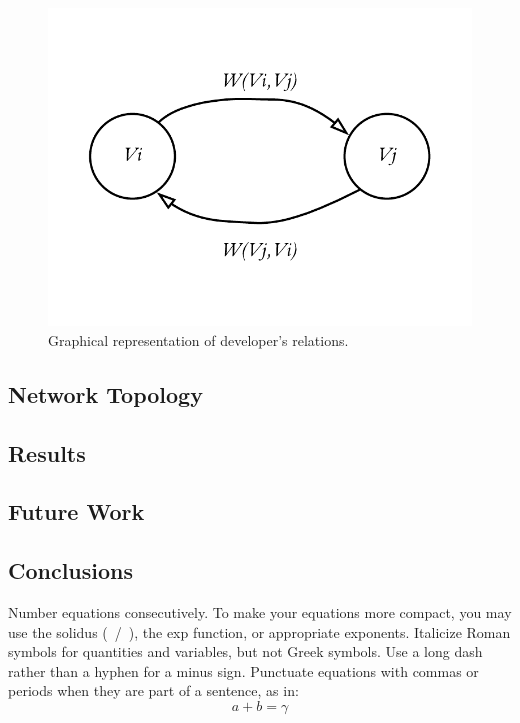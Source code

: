 \documentclass[conference]{IEEEtran}
\begin{document}
\begin{figure}[htbp]
\centerline{\includegraphics{graph}}
\caption{Graphical representation of developer's relations.}
\label{fig:graph}
\end{figure}

\subsection{Network Topology}

\subsection{Results}

\subsection{Future Work}

\subsection{Conclusions}

Number equations consecutively. To make your
equations more compact, you may use the solidus (~/~), the exp function, or
appropriate exponents. Italicize Roman symbols for quantities and variables,
but not Greek symbols. Use a long dash rather than a hyphen for a minus
sign. Punctuate equations with commas or periods when they are part of a
sentence, as in:
\begin{equation}
a+b=\gamma\label{eq}
\end{equation}
\end{document}
